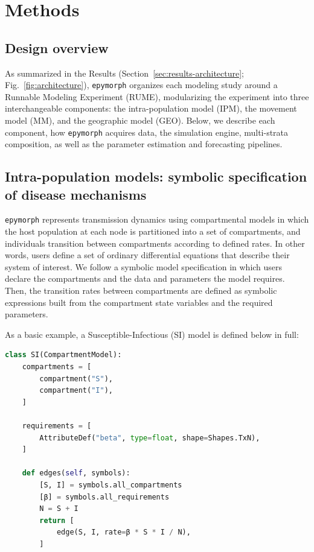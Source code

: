 \section{Methods}\label{sec:methods}

\subsection{Design overview}

As summarized in the Results (Section~\ref{sec:results-architecture}; Fig.~\ref{fig:architecture}), \texttt{epymorph} organizes each modeling study around a Runnable Modeling Experiment (RUME), modularizing the experiment into three interchangeable components: the intra-population model (IPM), the movement model (MM), and the geographic model (GEO). 
Below, we describe each component, how \texttt{epymorph} acquires data, the simulation engine, multi-strata composition, as well as the parameter estimation and forecasting pipelines.

\subsection{Intra-population models: symbolic specification of disease mechanisms}

\texttt{epymorph} represents transmission dynamics using compartmental models in which the host population at each node is partitioned into a set of compartments, and individuals transition between compartments according to defined rates. 
In other words, users define a set of ordinary differential equations that describe their system of interest.
We follow a symbolic model specification in which users declare the compartments and the data and parameters the model requires.
Then, the transition rates between compartments are defined as symbolic expressions built from the compartment state variables and the required parameters.

As a basic example, a Susceptible-Infectious (SI) model is defined below in full:

\begin{lstlisting}[language=Python]
class SI(CompartmentModel):
    compartments = [
        compartment("S"),
        compartment("I"),
    ]

    requirements = [
        AttributeDef("beta", type=float, shape=Shapes.TxN),
    ]

    def edges(self, symbols):
        [S, I] = symbols.all_compartments
        [β] = symbols.all_requirements
        N = S + I
        return [
            edge(S, I, rate=β * S * I / N),
        ]
\end{lstlisting}

